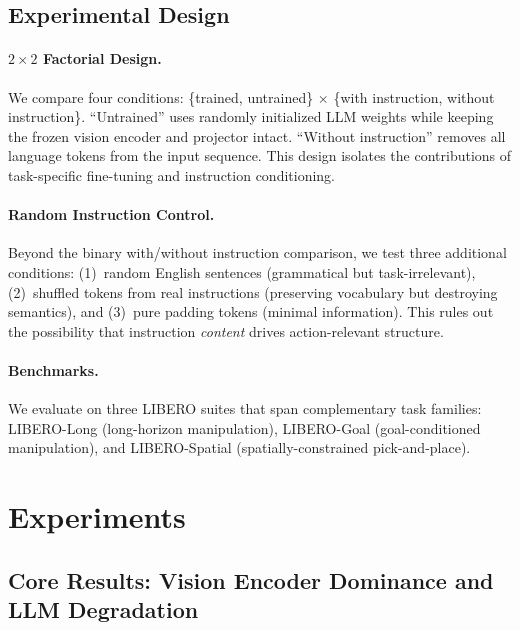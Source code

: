 \documentclass[10pt,letterpaper]{article}
\begin{document}
\subsection{Experimental Design}

\paragraph{$2{\times}2$ Factorial Design.}
We compare four conditions: \{trained, untrained\} $\times$ \{with instruction, without instruction\}.
``Untrained'' uses randomly initialized LLM weights while keeping the frozen vision encoder and projector intact.
``Without instruction'' removes all language tokens from the input sequence.
This design isolates the contributions of task-specific fine-tuning and instruction conditioning.

\paragraph{Random Instruction Control.}
Beyond the binary with/without instruction comparison, we test three additional conditions: (1)~random English sentences (grammatical but task-irrelevant), (2)~shuffled tokens from real instructions (preserving vocabulary but destroying semantics), and (3)~pure padding tokens (minimal information).
This rules out the possibility that instruction \emph{content} drives action-relevant structure.

\paragraph{Benchmarks.}
We evaluate on three LIBERO suites that span complementary task families:
LIBERO-Long (long-horizon manipulation), LIBERO-Goal (goal-conditioned manipulation), and LIBERO-Spatial (spatially-constrained pick-and-place).

\section{Experiments}
\label{sec:experiments}

\subsection{Core Results: Vision Encoder Dominance and LLM Degradation}
\label{sec:exp_core}
\end{document}
